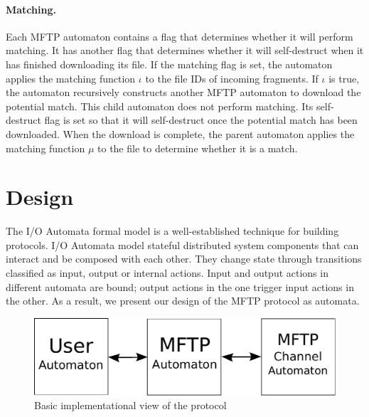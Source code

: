 \documentclass[letterpaper]{article}
\begin{document}
\paragraph{Matching.}
Each MFTP automaton contains a flag that determines whether it will perform matching. 
It has another flag that determines whether it will self-destruct when it has finished downloading its file.
If the matching flag is set, the automaton applies the matching function $\iota$ to the file IDs of incoming fragments.
If $\iota$ is true, the automaton recursively constructs another MFTP automaton to download the potential match.
This child automaton does not perform matching.  
Its self-destruct flag is set so that it will self-destruct once the potential match has been downloaded.
When the download is complete, the parent automaton applies the matching function $\mu$ to the file to determine whether it is a match.

\section{Design}

The I/O Automata formal model is a well-established technique for building protocols.
I/O Automata model stateful distributed system components that can interact and be composed with each other.
They change state through transitions classified as input, output or internal actions.
Input and output actions in different automata are bound; output actions in the one trigger input actions in the other.
As a result, we present our design of the MFTP protocol as automata.

\begin{figure}
  \center
  \includegraphics[scale=0.65]{diagramOne}
  \caption{Basic implementational view of the protocol \label{DesignOne}}
\end{figure}
\end{document}
